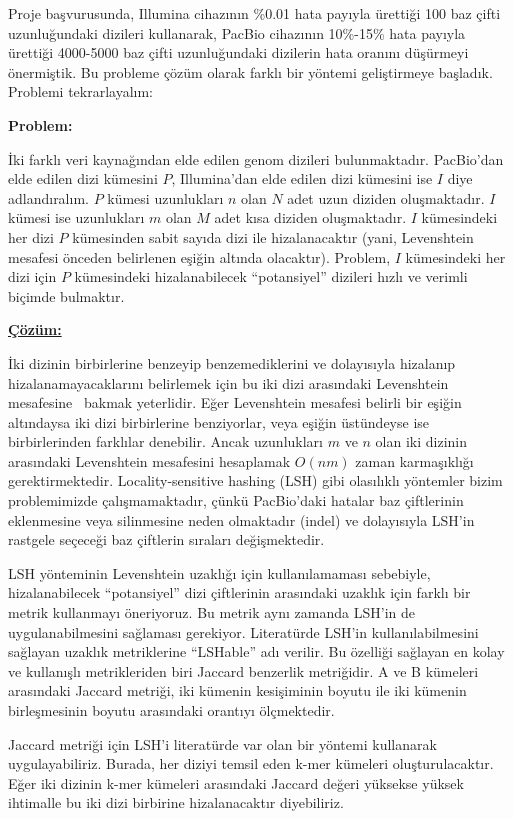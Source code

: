 \documentclass[11pt]{article}
\begin{document}
Proje başvurusunda, Illumina cihazının \%0.01 hata payıyla ürettiği 100 baz çifti uzunluğundaki dizileri kullanarak, PacBio cihazının 10\%-15\% hata payıyla ürettiği 4000-5000 baz çifti uzunluğundaki dizilerin hata oranını düşürmeyi önermiştik. Bu probleme çözüm olarak farklı bir yöntemi geliştirmeye başladık. Problemi tekrarlayalım: 

{\bf Problem:}

İki farklı veri kaynağından elde edilen genom dizileri bulunmaktadır. PacBio'dan elde edilen dizi kümesini $P$, Illumina'dan elde edilen dizi kümesini ise $I$ diye adlandıralım. $P$ kümesi uzunlukları $n$ olan $N$ adet uzun diziden oluşmaktadır. $I$ kümesi ise uzunlukları $m$ olan $M$ adet kısa diziden oluşmaktadır. $I$ kümesindeki her dizi $P$ kümesinden sabit sayıda dizi ile hizalanacaktır (yani, Levenshtein mesafesi önceden belirlenen eşiğin altında olacaktır). Problem, $I$ kümesindeki her dizi için $P$ kümesindeki hizalanabilecek ``potansiyel'' dizileri hızlı ve verimli biçimde bulmaktır.

{\bf {\underline{Çözüm:}}}

İki dizinin birbirlerine benzeyip benzemediklerini ve dolayısıyla hizalanıp hizalanamayacaklarını belirlemek için bu iki dizi arasındaki Levenshtein mesafesine~\cite{Levenshtein1966} bakmak yeterlidir. Eğer Levenshtein mesafesi belirli bir eşiğin altındaysa iki dizi birbirlerine benziyorlar, veya eşiğin üstündeyse ise birbirlerinden farklılar denebilir. Ancak uzunlukları $m$ ve $n$ olan iki dizinin arasındaki Levenshtein mesafesini hesaplamak $O(nm)$ zaman karmaşıklığı gerektirmektedir. Locality-sensitive hashing (LSH) gibi olasılıklı yöntemler bizim problemimizde çalışmamaktadır,  çünkü PacBio'daki hatalar baz çiftlerinin eklenmesine veya silinmesine neden olmaktadır (indel) ve dolayısıyla LSH'in rastgele seçeceği baz çiftlerin sıraları değişmektedir.


LSH yönteminin Levenshtein uzaklığı için kullanılamaması sebebiyle, hizalanabilecek ``potansiyel'' dizi çiftlerinin arasındaki uzaklık için farklı bir metrik kullanmayı öneriyoruz. Bu metrik aynı zamanda LSH'in de uygulanabilmesini sağlaması gerekiyor. Literatürde LSH'in kullanılabilmesini sağlayan uzaklık metriklerine ``LSHable'' adı verilir. Bu özelliği sağlayan en kolay ve kullanışlı metrikleriden biri Jaccard benzerlik metriğidir. A ve B kümeleri arasındaki Jaccard metriği, iki kümenin kesişiminin boyutu ile iki kümenin birleşmesinin boyutu arasındaki orantıyı ölçmektedir.


Jaccard metriği için LSH'i literatürde var olan bir yöntemi \cite{Broder1998} kullanarak uygulayabiliriz. Burada, her diziyi temsil eden k-mer kümeleri oluşturulacaktır. Eğer iki dizinin k-mer kümeleri arasındaki Jaccard değeri yüksekse yüksek ihtimalle bu iki dizi birbirine hizalanacaktır diyebiliriz.
\end{document}

